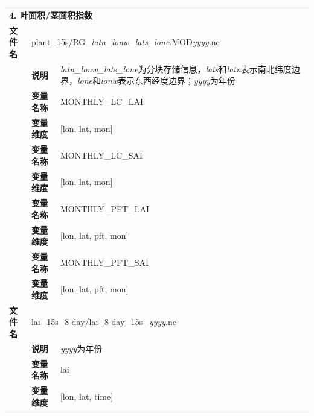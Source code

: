 \documentclass[a4paper,12pt,twoside]{article}
\begin{document}
{\begin{longtable}{llp{}}
\midrule
\vspace{2\baselineskip}\\
\multicolumn{3}{l}{\textbf{4. 叶面积/茎面积指数}} \\
\cline{1-3}
\textbf{文件名} & \multicolumn{2}{l}{plant\_15s/RG\_\textit{latn\_lonw\_lats\_lone}.MOD\textit{yyyy}.nc} \\
& \textbf{说明} & \textit{latn\_lonw\_lats\_lone}为分块存储信息，\textit{lats}和\textit{latn}表示南北纬度边界，\textit{lone}和\textit{lonw}表示东西经度边界；\textit{yyyy}为年份 \\
\cline{2-3}
& \textbf{变量名称} & MONTHLY\_LC\_LAI \\
& \textbf{变量维度} & {[}lon, lat, mon{]} \\
\cline{2-3}
& \textbf{变量名称} & MONTHLY\_LC\_SAI \\
& \textbf{变量维度} & {[}lon, lat, mon{]} \\
\cline{2-3}
& \textbf{变量名称} & MONTHLY\_PFT\_LAI \\
& \textbf{变量维度} & {[}lon, lat, pft, mon{]} \\
\cline{2-3}
& \textbf{变量名称} & MONTHLY\_PFT\_SAI \\
& \textbf{变量维度} & {[}lon, lat, pft, mon{]} \\
\cline{1-3}
\textbf{文件名} & \multicolumn{2}{l}{lai\_15s\_8-day/lai\_8-day\_15s\_\textit{yyyy}.nc} \\
& \textbf{说明} & \textit{yyyy}为年份 \\
\cline{2-3}
& \textbf{变量名称} & lai \\
& \textbf{变量维度} & {[}lon, lat, time{]} \\


\end{longtable}}
\end{document}
